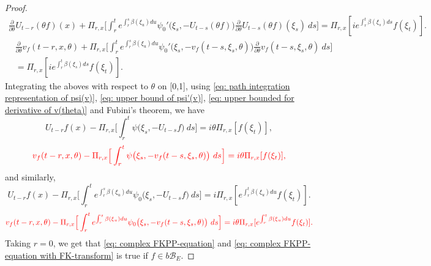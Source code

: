 \documentclass[12pt,oneside,english]{amsart}
\theoremstyle{plain}
\theoremstyle{definition}
\numberwithin{equation}{section}
\newcommand{\added}[1]{{\color{blue}#1}}\newcommand{\deleted}[1]{{\color{red}#1}}
\begin{document}
\begin{proof}
{\begin{align}
    \frac{\partial}{\partial \theta} U_{t-r}(\theta f)(x) + \Pi_{r,x} \Big[\int_r^t e^{\int_r^s \beta(\xi_u)du}\psi_0'\big(\xi_s,- U_{t-s}(\theta f)\big)\frac{\partial}{\partial \theta} U_{t-s}(\theta f)(\xi_s)~ds\Big]
    = \Pi_{r,x} [i e^{\int_r^t \beta(\xi_s)ds}f(\xi_t)].
\end{align}}
\deleted{
\begin{align}
    &\frac{\partial}{\partial \theta} v_f(t-r, x, \theta) + \Pi_{r,x} \Big[\int_r^t e^{\int_r^s \beta(\xi_u)du}\psi_0'\big(\xi_s,- v_f(t-s,\xi_s,\theta)\big)\frac{\partial}{\partial \theta} v_f(t-s, \xi_s, \theta)~ds\Big]
    \\&= \Pi_{r,x} [i e^{\int_r^t \beta(\xi_s)ds}f(\xi_t)].
\end{align}
}
    Integrating the aboves with respect to $\theta$ \added{ on [0,1]}, using \eqref{eq: path integration representation of psi(v)}, \eqref{eq: upper bound of psi'(v)}, \eqref{eq: upper bounded for derivative of v(theta)} and Fubini's theorem, we have
\deleted{
\begin{equation}
    U_{t-r}f(x) - \Pi_{r,x} \Big[\int_r^t \psi\big(\xi_s,-U_{t-s}f\big) ~ds\Big]
    = i\theta \Pi_{r,x} [f(\xi_t)],
\end{equation}}
\begin{equation}
    \deleted{v_f(t-r,x,\theta) - \Pi_{r,x} \Big[\int_r^t \psi\big(\xi_s,-v_f(t-s,\xi_s,\theta)\big) ~ds\Big]
    = i\theta \Pi_{r,x} [f(\xi_t)],}
\end{equation}
    and similarly,
\deleted{
\begin{equation}
    U_{t-r}f(x) - \Pi_{r,x} \Big[\int_r^t e^{\int_r^s \beta(\xi_u)du} \psi_0\big(\xi_s,- U_{t-s}f\big) ~ds\Big]
    = i\Pi_{r,x} [e^{\int_r^t\beta(\xi_u)du}f(\xi_t)].
\end{equation}}
\begin{equation}
    \deleted{v_f(t-r,x,\theta) - \Pi_{r,x} \Big[\int_r^t e^{\int_r^s \beta(\xi_u)du} \psi_0\big(\xi_s,-v_f(t-s,\xi_s,\theta)\big) ~ds\Big]
    = i\theta \Pi_{r,x} [e^{\int_r^t\beta(\xi_u)du}f(\xi_t)].}
\end{equation}
    Taking $r = 0$, we get that \eqref{eq: complex FKPP-equation} and \eqref{eq: complex FKPP-equation with FK-transform} is true if $f\in b\mathscr B_E$.


\end{proof}
\end{document}
